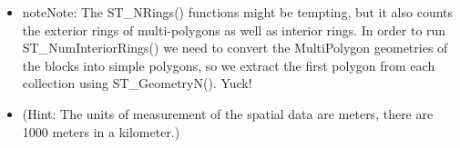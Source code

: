 \documentclass[a4paper,11pt,english]{sphinxmanual}
\begin{document}
\begin{itemize}
\begin{sphinxVerbatim}[commandchars=\\\{\}]
\end{sphinxVerbatim}

\item {} 

\begin{sphinxVerbatim}[commandchars=\\\{\}]
 
   
     
\end{sphinxVerbatim}

\begin{sphinxadmonition}{note}{Note:}
The ST\_NRings() functions might be tempting, but it also counts the exterior rings of multi-polygons as well as interior rings.  In order to run ST\_NumInteriorRings() we need to convert the MultiPolygon geometries of the blocks into simple polygons, so we extract the first polygon from each collection using ST\_GeometryN(). Yuck!
\end{sphinxadmonition}

\begin{sphinxVerbatim}[commandchars=\\\{\}]
\end{sphinxVerbatim}

\item {} 
 (Hint: The units of measurement of the spatial data are meters, there are 1000 meters in a kilometer.)

\begin{sphinxVerbatim}[commandchars=\\\{\}]
   
   
\end{sphinxVerbatim}

\begin{sphinxVerbatim}[commandchars=\\\{\}]
\end{sphinxVerbatim}


\end{itemize}
\end{document}
